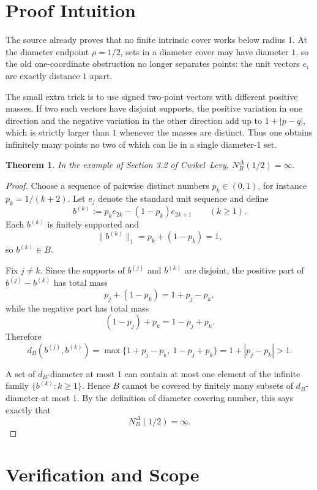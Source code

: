 \documentclass[11pt]{article}
\newtheorem{theorem}{Theorem}
\begin{document}
\section*{Proof Intuition}

The source already proves that no finite intrinsic cover works below radius
\(1\). At the diameter endpoint \(\rho=1/2\), sets in a diameter cover may have
diameter \(1\), so the old one-coordinate obstruction no longer separates
points: the unit vectors \(e_i\) are exactly distance \(1\) apart.

The small extra trick is to use signed two-point vectors with different
positive masses. If two such vectors have disjoint supports, the positive
variation in one direction and the negative variation in the other direction
add up to \(1+|p-q|\), which is strictly larger than \(1\) whenever the masses
are distinct. Thus one obtains infinitely many points no two of which can lie
in a single diameter-\(1\) set.

\begin{theorem}
In the example of Section 3.2 of Cwikel--Levy, \(N_B^\Delta(1/2)=\infty\).
\end{theorem}

\begin{proof}
Choose a sequence of pairwise distinct numbers \(p_k\in(0,1)\), for instance
\(p_k=1/(k+2)\). Let \(e_j\) denote the standard unit sequence and define
\[
  b^{(k)}:=p_k e_{2k}-(1-p_k)e_{2k+1}\qquad(k\ge1).
\]
Each \(b^{(k)}\) is finitely supported and
\[
  \|b^{(k)}\|_1=p_k+(1-p_k)=1,
\]
so \(b^{(k)}\in B\).

Fix \(j\ne k\). Since the supports of \(b^{(j)}\) and \(b^{(k)}\) are disjoint,
the positive part of \(b^{(j)}-b^{(k)}\) has total mass
\[
  p_j+(1-p_k)=1+p_j-p_k,
\]
while the negative part has total mass
\[
  (1-p_j)+p_k=1-p_j+p_k.
\]
Therefore
\[
  d_B(b^{(j)},b^{(k)})
  =\max\{1+p_j-p_k,\ 1-p_j+p_k\}
  =1+|p_j-p_k|>1.
\]

A set of \(d_B\)-diameter at most \(1\) can contain at most one element of the
infinite family \(\{b^{(k)}:k\ge1\}\). Hence \(B\) cannot be covered by
finitely many subsets of \(d_B\)-diameter at most \(1\). By the definition of
diameter covering number, this says exactly that
\[
  N_B^\Delta(1/2)=\infty .
\]
\end{proof}

\section*{Verification and Scope}
\end{document}
